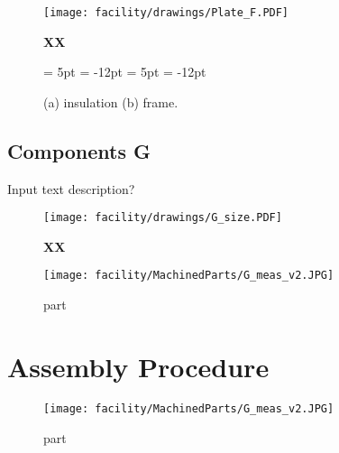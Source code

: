 \begin{figure}[h!]
\centering
\texttt{[image: facility/drawings/Plate\_F.PDF]}
\caption{\footnotesize {\bf XX} } 
\end{figure}

\begin{figure}[h!]
  \begin{center}
  {\subfigcapskip = 5pt \subfigcapmargin = -12pt }
   {\subfigcapskip = 5pt \subfigcapmargin = -12pt  }
  \end{center}
\caption{(a) insulation (b) frame. } 
\end{figure}

\clearpage
\subsection{Components G}
Input text description?\\

\begin{figure}[h!]
\centering
\texttt{[image: facility/drawings/G\_size.PDF]}
\caption{\footnotesize {\bf XX} } 
\end{figure}


\begin{figure}[h!]
\centering
\texttt{[image: facility/MachinedParts/G\_meas\_v2.JPG]}
\caption{ \footnotesize part}
\end{figure}


\clearpage
\section{Assembly Procedure}

\begin{figure}[h!]
\centering
\texttt{[image: facility/MachinedParts/G\_meas\_v2.JPG]}
\caption{ \footnotesize part}
\label{fig:partsG}
\end{figure}